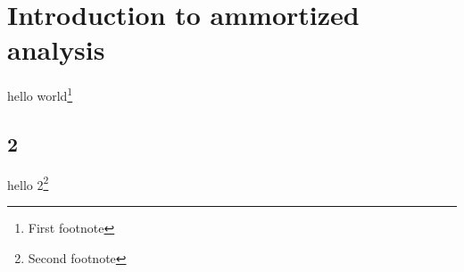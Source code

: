 \section{Introduction to ammortized analysis}
hello world\footnote{First footnote}
\subsection{2}
hello 2\footnote{Second footnote}